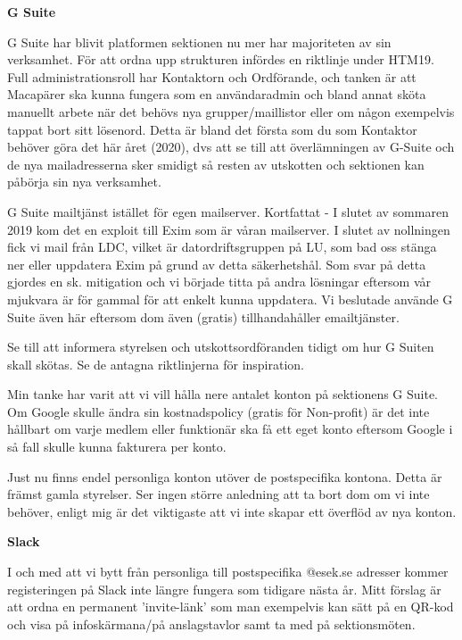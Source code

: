 \documentclass[10pt]{article}
\begin{document}
{\large \textbf{G Suite}}

G Suite har blivit platformen sektionen nu mer har majoriteten av sin verksamhet. För att ordna upp strukturen infördes en riktlinje under HTM19. Full administrationsroll har Kontaktorn och Ordförande, och tanken är att Macapärer ska kunna fungera som en användaradmin och bland annat sköta manuellt arbete när det behövs nya grupper/maillistor eller om någon exempelvis tappat bort sitt lösenord. 
Detta är bland det första som du som Kontaktor behöver göra det här året (2020), dvs att se till att överlämningen av G-Suite och de nya mailadresserna sker smidigt så resten av utskotten och sektionen kan påbörja sin nya verksamhet. 

\begin{dashlist}
    \item G Suite mailtjänst istället för egen mailserver. Kortfattat - I slutet av sommaren 2019 kom det en exploit till Exim som är våran mailserver. I slutet av nollningen fick vi mail från LDC, vilket är datordriftsgruppen på LU, som bad oss stänga ner eller uppdatera Exim på grund av detta säkerhetshål. Som svar på detta gjordes en sk. mitigation och vi började titta på andra lösningar eftersom vår mjukvara är för gammal för att enkelt kunna uppdatera. 
    Vi beslutade använde G Suite även här eftersom dom även (gratis) tillhandahåller emailtjänster. 
    \item Se till att informera styrelsen och utskottsordföranden tidigt om hur G Suiten skall skötas. Se de antagna riktlinjerna för inspiration.
    \item Min tanke har varit att vi vill hålla nere antalet konton på sektionens G Suite. Om Google skulle ändra sin kostnadspolicy (gratis för Non-profit) är det inte hållbart om varje medlem eller funktionär ska få ett eget konto eftersom Google i så fall skulle kunna fakturera per konto. 
    \item Just nu finns endel personliga konton utöver de postspecifika kontona. Detta är främst gamla styrelser. Ser ingen större anledning att ta bort dom om vi inte behöver, enligt mig är det viktigaste att vi inte skapar ett överflöd av nya konton. 
\end{dashlist}

{\large \textbf{Slack}}

I och med att vi bytt från personliga till postspecifika @esek.se adresser kommer registeringen på Slack inte längre fungera som tidigare nästa år. Mitt förslag är att ordna en permanent 'invite-länk' som man exempelvis kan sätt på en QR-kod och visa på infoskärmana/på anslagstavlor samt ta med på sektionsmöten. 
\end{document}
